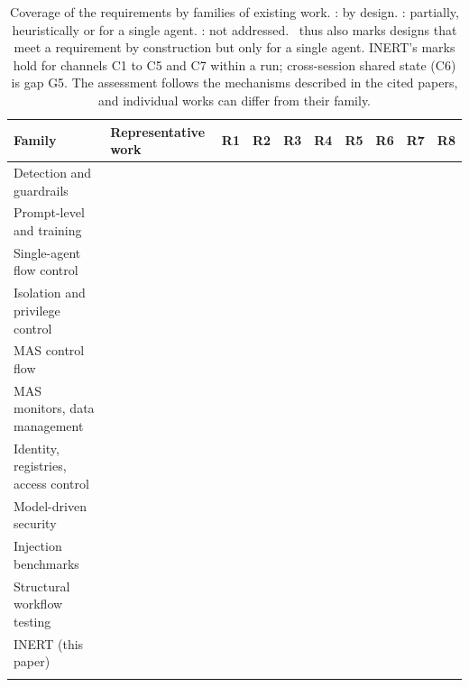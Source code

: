 \documentclass[pdflatex,sn-mathphys-num]{sn-jnl}
\theoremstyle{thmstyleone}%
\theoremstyle{thmstyletwo}%
\theoremstyle{thmstylethree}%
\newcommand{\cfull}{\usebox{\cfullbox}}
\newcommand{\chalf}{\usebox{\chalfbox}}
\newcommand{\cnone}{\usebox{\cnonebox}}
\begin{document}
\begin{table}[tbp]
\caption{Coverage of the requirements by families of existing work. \cfull: by design. \chalf: partially, heuristically or for a single agent. \cnone: not addressed. \chalf\ thus also marks designs that meet a requirement by construction but only for a single agent. INERT's marks hold for channels C1 to C5 and C7 within a run; cross-session shared state (C6) is gap G5. The assessment follows the mechanisms described in the cited papers, and individual works can differ from their family.}\label{tab:gaps}
\scriptsize\setlength{\tabcolsep}{2.4pt}
\begin{tabular*}{\textwidth}{@{\extracolsep\fill}L{3.0cm}L{3.0cm}cccccccc@{}}
\toprule
Family & Representative work & R1 & R2 & R3 & R4 & R5 & R6 & R7 & R8 \\
\midrule
Detection and guardrails & \citep{inan2023llamaguard,li2025piguard,abdelnabi2025drift,zhu2025melon} & \cnone & \cnone & \cnone & \cnone & \chalf & \cnone & \cnone & \cnone \\
Prompt-level and training & \citep{hines2024spotlighting,chen2025struq,wallace2024hierarchy,chen2025secalign} & \cnone & \cnone & \cnone & \cnone & \chalf & \cnone & \cnone & \cnone \\
Single-agent flow control & \citep{debenedetti2025camel,wu2024ifc,li2025drift,an2025ipiguard,zhong2025rtbas,li2026ace} & \chalf & \cnone & \cnone & \cnone & \cfull & \cnone & \chalf & \cnone \\
Isolation and privilege control & \citep{wu2025isolategpt,shi2025progent,kim2025pfi,tsai2025conseca} & \chalf & \chalf & \cnone & \cnone & \chalf & \cnone & \chalf & \cnone \\
MAS control flow & \citep{jha2025controlvalve} & \chalf & \cnone & \cnone & \cnone & \chalf & \cnone & \cnone & \cnone \\
MAS monitors, data management & \citep{Wang2025GSafeguardATAW,Miao2025BlindGuardSLAV,Mao2025AgentSafeSLY} & \cnone & \chalf & \cnone & \cnone & \chalf & \cnone & \cnone & \cnone \\
Identity, registries, access control & \citep{Zou2025BlockA2ATSAC,Narajala2025SecuringGMAU,Ji2026TamingVPAP} & \cnone & \cfull & \cnone & \chalf & \cnone & \cnone & \chalf & \cnone \\
Model-driven security & \citep{lodderstedt2002secureuml,jurjens2002umlsec,basin2006mds} & \chalf & \chalf & \cnone & \cnone & \cnone & \cnone & \cnone & \cnone \\
Injection benchmarks & \citep{debenedetti2024agentdojo,zhan2024injecagent,evtimov2025wasp,kavathekar2025tamas,An2026ACIArenaTUH} & \cnone & \cnone & \cnone & \cnone & \cnone & \cnone & \chalf & \chalf \\
Structural workflow testing & \citep{kahani2026structural} & \cnone & \cnone & \cnone & \cnone & \cnone & \cnone & \cnone & \chalf \\
\midrule
INERT (this paper) & & \cfull & \cfull & \cfull & \cfull & \cfull & \cfull & \cfull & \cfull \\
\botrule
\end{tabular*}
\end{table}
\end{document}
